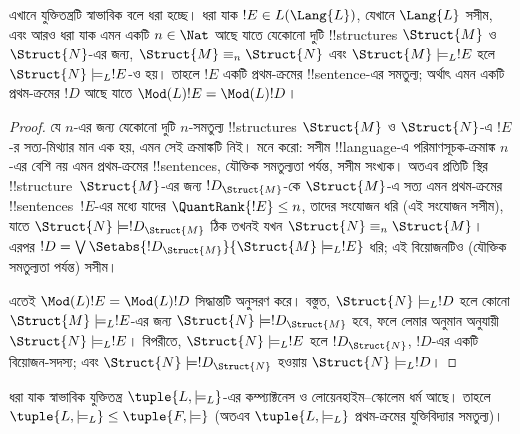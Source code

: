 \documentclass[../../../include/open-logic-section]{subfiles}
\begin{document}


\begin{lem}
এখানে যুক্তিতন্ত্রটি স্বাভাবিক বলে ধরা হচ্ছে। ধরা যাক $!E \in L(\Lang{L})$, যেখানে $\Lang{L}$ সসীম, এবং আরও
ধরা যাক এমন একটি $n \in \Nat$ আছে যাতে যেকোনো দুটি !!{structure}s
$\Struct{M}$ ও~$\Struct{N}$-এর জন্য, $\Struct{M} \equiv_n
\Struct{N}$ এবং $\Struct{M} \models_L !E$ হলে
$\Struct{N} \models_L !E$-ও হয়। তাহলে $!E$ একটি প্রথম-ক্রমের
!!{sentence}-এর সমতুল্য; অর্থাৎ এমন একটি প্রথম-ক্রমের $!D$ আছে যাতে
$\Mod(L){!E} = \Mod(L){!D}$।
\end{lem}

\begin{proof} 
যে $n$-এর জন্য যেকোনো দুটি $n$-সমতুল্য !!{structure}s
$\Struct{M}$ ও $\Struct{N}$-এ $!E$-র সত্য-মিথ্যার মান এক হয়, এমন
সেই ক্রমাঙ্কটি নিই।  মনে করো: সসীম
!!{language}-এ পরিমাণসূচক-ক্রমাঙ্ক $n$-এর বেশি নয় এমন প্রথম-ক্রমের
!!{sentence}s, যৌক্তিক সমতুল্যতা পর্যন্ত, সসীম সংখ্যক। অতএব প্রতিটি
স্থির !!{structure}~$\Struct{M}$-এর জন্য $!D_{\Struct{M}}$-কে
$\Struct{M}$-এ সত্য এমন প্রথম-ক্রমের !!{sentence}s~$!E$-এর মধ্যে
যাদের $\QuantRank{!E} \le n$, তাদের সংযোজন ধরি (এই সংযোজন সসীম), যাতে
$\Struct{N} \models !D_{\Struct{M}}$ ঠিক তখনই যখন
$\Struct{N} \equiv_n \Struct{M}$। এরপর
$!D = \textstyle\bigvee
\Setabs{!D_{\Struct{M}}}{\Struct{M} \models_L !E}$ ধরি; এই
বিয়োজনটিও (যৌক্তিক সমতুল্যতা পর্যন্ত) সসীম।

এতেই $\Mod(L){!E} = \Mod(L){!D}$ সিদ্ধান্তটি অনুসরণ করে। বস্তুত,
$\Struct{N} \models_L !D$ হলে কোনো $\Struct{M} \models_L !E$-এর জন্য
$\Struct{N} \models !D_{\Struct{M}}$ হবে, ফলে লেমার অনুমান অনুযায়ী
$\Struct{N} \models_L !E$। বিপরীতে, $\Struct{N} \models_L !E$ হলে
$!D_\Struct{N}$, $!D$-এর একটি বিয়োজন-সদস্য; এবং
$\Struct{N} \models !D_\Struct{N}$ হওয়ায়
$\Struct{N} \models_L !D$।
\end{proof}

\begin{thm}[লিন্ডস্ট্রমের উপপাদ্য]
   ধরা যাক স্বাভাবিক যুক্তিতন্ত্র $\tuple{L, \models_L}$-এর
  কম্প্যাক্টনেস ও লোয়েনহাইম--স্কোলেম ধর্ম আছে। তাহলে
  $\tuple{L, \models_L} \le \tuple{F, \models}$ (অতএব
  $\tuple{L, \models_L}$ প্রথম-ক্রমের যুক্তিবিদ্যার সমতুল্য)।
\end{thm}
\end{document}
